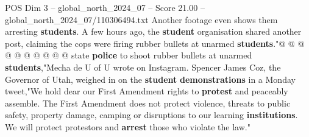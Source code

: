 \begin{textsample}{POS Dim 3 – global\_north\_2024\_07 – Score 21.00 – global\_north\_2024\_07/110306494.txt}
Another footage even shows them arresting \textbf{students}.
A few hours ago, the \textbf{student} organisation shared another post, claiming the cops were firing rubber bullets at unarmed \textbf{students}."@ @ @ @ @ @ @ @ @ @ state \textbf{police} to shoot rubber bullets at unarmed \textbf{students},"Mecha de U of U wrote on Instagram.
Spencer James Coz, the Governor of Utah, weighed in on the \textbf{student} \textbf{demonstrations} in a Monday tweet,"We hold dear our First Amendment rights to \textbf{protest} and peaceably assemble.
The First Amendment does not protect violence, threats to public safety, property damage, camping or disruptions to our learning \textbf{institutions}.
We will protect protestors and \textbf{arrest} those who violate the law."

\end{textsample}
